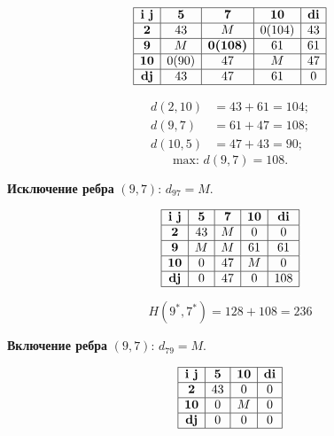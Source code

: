 \documentclass[17pt]{extarticle}
\begin{document}
\[
    \begin{array}{|c|c|c|c|c|}
        \hline
        \textbf{i j} & \textbf{5} & \textbf{7}      & \textbf{10} & \textbf{di} \\
        \hline
        \textbf{2}   & 43         & M               & 0(104)      & 43          \\
        \hline
        \textbf{9}   & M          & \textbf{0(108)} & 61          & 61          \\
        \hline
        \textbf{10}  & 0(90)      & 47              & M           & 47          \\
        \hline
        \textbf{dj}  & 43         & 47              & 61          & 0           \\
        \hline
    \end{array}
\]

\[
    \begin{aligned}
        d(2,10) & = 43 + 61 = 104; \\
        d(9,7)  & = 61 + 47 = 108; \\
        d(10,5) & = 47 + 43 = 90;
    \end{aligned}
\]
\[ \text{max: } d(9,7) = 108. \]

\textbf{Исключение ребра} \((9,7)\): \( d_{97} = M \).

\[
    \begin{array}{|c|c|c|c|c|}
        \hline
        \textbf{i j} & \textbf{5} & \textbf{7} & \textbf{10} & \textbf{di} \\
        \hline
        \textbf{2}   & 43         & M          & 0           & 0           \\
        \hline
        \textbf{9}   & M          & M          & 61          & 61          \\
        \hline
        \textbf{10}  & 0          & 47         & M           & 0           \\
        \hline
        \textbf{dj}  & 0          & 47         & 0           & 108         \\
        \hline
    \end{array}
\]

\[ H(9^*,7^*) = 128 + 108 = 236 \]

\textbf{Включение ребра} \((9,7)\): \( d_{79} = M \).

\[
    \begin{array}{|c|c|c|c|}
        \hline
        \textbf{i j} & \textbf{5} & \textbf{10} & \textbf{di} \\
        \hline
        \textbf{2}   & 43         & 0           & 0           \\
        \hline
        \textbf{10}  & 0          & M           & 0           \\
        \hline
        \textbf{dj}  & 0          & 0           & 0           \\
        \hline
    \end{array}
\]
\end{document}
